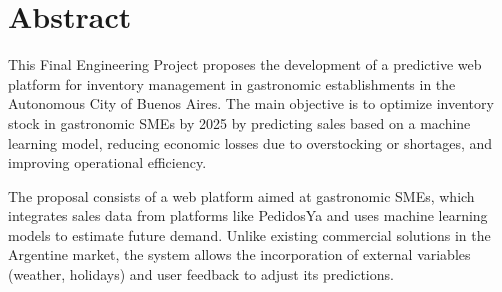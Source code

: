 \chapter*{Abstract}

This Final Engineering Project proposes the development of a predictive web platform for inventory management in gastronomic establishments in the Autonomous City of Buenos Aires. The main objective is to optimize inventory stock in gastronomic SMEs by 2025 by predicting sales based on a machine learning model, reducing economic losses due to overstocking or shortages, and improving operational efficiency.

The proposal consists of a web platform aimed at gastronomic SMEs, which integrates sales data from platforms like PedidosYa and uses machine learning models to estimate future demand. Unlike existing commercial solutions in the Argentine market, the system allows the incorporation of external variables (weather, holidays) and user feedback to adjust its predictions.
